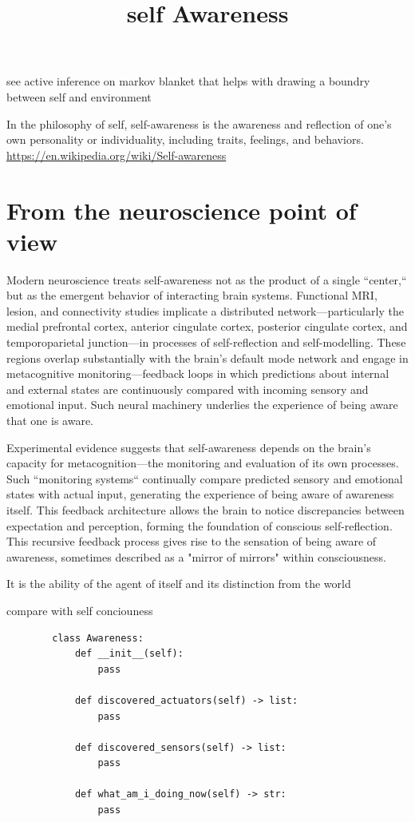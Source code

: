 \documentclass[a4paper]{article}
\title{self Awareness}
\date{}
\begin{document}
    \maketitle
    see active inference on markov blanket that helps with drawing a boundry between self and environment
    
    In the philosophy of self, self-awareness is the awareness and reflection of one's own personality or individuality, including traits, feelings, and behaviors. \url{https://en.wikipedia.org/wiki/Self-awareness}
    
    \section{From the neuroscience point of view}
    Modern neuroscience treats self-awareness not as the product of a single ``center,`` but as the emergent behavior of interacting brain systems. Functional MRI, lesion, and connectivity studies implicate a distributed network—particularly the medial prefrontal cortex, anterior cingulate cortex, posterior cingulate cortex, and temporoparietal junction—in processes of self-reflection and self-modelling. These regions overlap substantially with the brain's default mode network and engage in metacognitive monitoring—feedback loops in which predictions about internal and external states are continuously compared with incoming sensory and emotional input. Such neural machinery underlies the experience of being aware that one is aware.\cite{fleming-frith-2014-metacognition}

    Experimental evidence suggests that self-awareness depends on the brain's capacity for metacognition—the monitoring and evaluation of its own processes. Such ``monitoring systems`` continually compare predicted sensory and emotional states with actual input, generating the experience of being aware of awareness itself. This feedback architecture allows the brain to notice discrepancies between expectation and perception, forming the foundation of conscious self-reflection. This recursive feedback process gives rise to the sensation of being aware of awareness, sometimes described as a "mirror of mirrors" within consciousness.\cite{garcia-dick-2013-stuck-in-the-moment}


    
    It is the ability of the agent of itself and its distinction from the world
    
    compare with self conciouness
    \begin{verbatim}
        class Awareness:
            def __init__(self):
                pass
            
            def discovered_actuators(self) -> list:
                pass
            
            def discovered_sensors(self) -> list:
                pass
            
            def what_am_i_doing_now(self) -> str:
                pass
    \end{verbatim}
    
    
    
    
\end{document}
